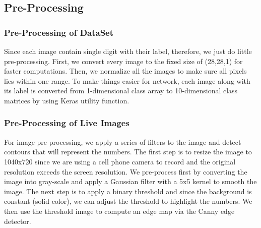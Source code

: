 \documentclass[12pt, letterpaper]{article}
\begin{document}
\subsection{Pre-Processing}

\subsubsection{Pre-Processing of DataSet}

Since each image contain single digit with their label, therefore, we just do little pre-processing. First, we convert every image to the fixed size of (28,28,1) for faster computations. Then, we normalize all the images to make sure all pixels lies within one range. To make things easier for network, each image along with its label is converted from 1-dimensional class array to 10-dimensional class matrices by using Keras utility function.

\subsubsection{Pre-Processing of Live Images} 

For image pre-processing, we apply a series of filters to the image and detect contours that will represent the numbers. The first step is to resize the image to 1040x720 since we are using a cell phone camera to record and the original resolution exceeds the screen resolution. We pre-process first by converting the image into gray-scale and apply a Gaussian filter with a 5x5 kernel to smooth the image. The next step is to apply a binary threshold and since the background is constant (solid color), we can adjust the threshold to highlight the numbers. We then use the threshold image to compute an edge map via the Canny edge detector. 
\end{document}

